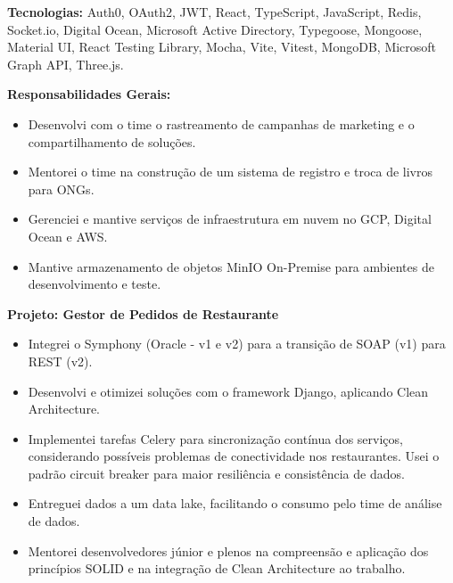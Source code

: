 \documentclass[10pt,a4paper]{altacv}
\begin{document}
\textbf{Tecnologias:} Auth0, OAuth2, JWT, React, TypeScript, JavaScript, Redis, Socket.io, Digital Ocean, Microsoft Active Directory, Typegoose, Mongoose, Material UI, React Testing Library, Mocha, Vite, Vitest, MongoDB, Microsoft Graph API, Three.js.

\vspace{5mm}

\textbf{Responsabilidades Gerais:}
\begin{itemize}
    \setlength{\itemindent}{0.5em}
    \item[--] Desenvolvi com o time o rastreamento de campanhas de marketing e o compartilhamento de soluções.
    \item[--] Mentorei o time na construção de um sistema de registro e troca de livros para ONGs.
    \item[--] Gerenciei e mantive serviços de infraestrutura em nuvem no GCP, Digital Ocean e AWS.
    \item[--] Mantive armazenamento de objetos MinIO On-Premise para ambientes de desenvolvimento e teste.
\end{itemize}

\break
\newpage
{}
\textbf{Projeto: Gestor de Pedidos de Restaurante}
\begin{itemize}
    \setlength{\itemindent}{0.5em}
    \item[--] Integrei o Symphony (Oracle - v1 e v2) para a transição de SOAP (v1) para REST (v2).
    \item[--] Desenvolvi e otimizei soluções com o framework Django, aplicando Clean Architecture.
    \item[--] Implementei tarefas Celery para sincronização contínua dos serviços, considerando possíveis problemas de conectividade nos restaurantes. Usei o padrão circuit breaker para maior resiliência e consistência de dados.
    \item[--] Entreguei dados a um data lake, facilitando o consumo pelo time de análise de dados.
    \item[--] Mentorei desenvolvedores júnior e plenos na compreensão e aplicação dos princípios SOLID e na integração de Clean Architecture ao trabalho.
\end{itemize}
\end{document}
